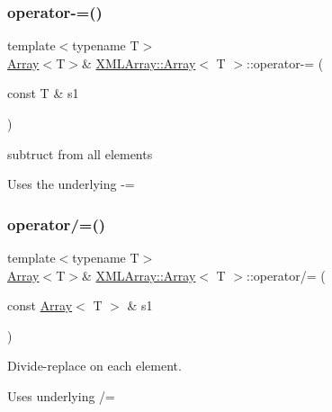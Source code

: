 \subsubsection{\texorpdfstring{operator-\/=()}{operator-=()}\hspace{0.1cm}{\footnotesize\ttfamily [6/6]}}
{\footnotesize\ttfamily template$<$typename T$>$ \\
\mbox{\hyperlink{classXMLArray_1_1Array}{Array}}$<$T$>$\& \mbox{\hyperlink{classXMLArray_1_1Array}{X\+M\+L\+Array\+::\+Array}}$<$ T $>$\+::operator-\/= (\begin{DoxyParamCaption}\item[{const T \&}]{s1 }\end{DoxyParamCaption})\hspace{0.3cm}{\ttfamily [inline]}}



subtruct from all elements 

Uses the underlying -\/= \mbox{\label{classXMLArray_1_1Array_ad729e7678e412fb09104173dbe12a1fc}} 
\subsubsection{\texorpdfstring{operator/=()}{operator/=()}\hspace{0.1cm}{\footnotesize\ttfamily [1/6]}}
{\footnotesize\ttfamily template$<$typename T$>$ \\
\mbox{\hyperlink{classXMLArray_1_1Array}{Array}}$<$T$>$\& \mbox{\hyperlink{classXMLArray_1_1Array}{X\+M\+L\+Array\+::\+Array}}$<$ T $>$\+::operator/= (\begin{DoxyParamCaption}\item[{const \mbox{\hyperlink{classXMLArray_1_1Array}{Array}}$<$ T $>$ \&}]{s1 }\end{DoxyParamCaption})\hspace{0.3cm}{\ttfamily [inline]}}



Divide-\/replace on each element. 

Uses underlying /= \mbox{\label{classXMLArray_1_1Array_ad729e7678e412fb09104173dbe12a1fc}} 

